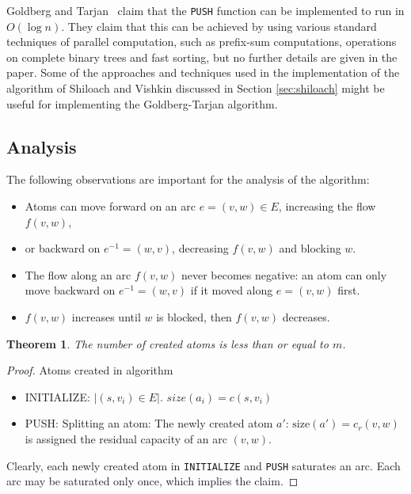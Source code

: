 \documentclass[a4paper,10pt, twocolumn]{article}
\newtheorem{theorem}[lemma]{Theorem}
\begin{document}
Goldberg and Tarjan~\cite{goldberg89} claim that the \lstinline|PUSH| function can be implemented to run in $O(\log n)$. They claim that this can be achieved by using various standard techniques of parallel computation, such as prefix-sum computations, operations on complete binary trees and fast sorting, but no further details are given in the paper. Some of the approaches and techniques used in the implementation of the algorithm of Shiloach and Vishkin discussed in Section \ref{sec:shiloach} might be useful for implementing the Goldberg-Tarjan algorithm.


\subsection{Analysis}
\label{sec:gt_analysis}
The following observations are important for the analysis of the algorithm:
\begin{itemize}
	\item Atoms can move forward on an arc $e=(v,w) \in E$, increasing the flow $f(v,w)$,
	\item or backward on $e^{-1}=(w,v)$, decreasing $f(v,w)$ and blocking $w$. 
	\item The flow along an arc $f(v,w)$ never becomes negative: an atom can only move backward on $e^{-1}=(w,v)$ if it moved along $e=(v,w)$ first.
	\item $f(v,w)$ increases until $w$ is blocked, then $f(v,w)$ decreases.
\end{itemize}

\begin{theorem}
The number of created atoms is less than or equal to $m$.
\end{theorem}
\begin{proof}
Atoms created in algorithm
\begin{itemize}
	\item INITIALIZE: $\lvert (s,v_i) \in E \rvert$. $size(a_i) = c(s,v_i)$
	\item PUSH: Splitting an atom: The newly created atom $a'$: $\mathrm{size}(a') = c_r(v,w)$ is assigned the residual capacity of an arc $(v,w)$.
\end{itemize}
Clearly, each newly created atom in \lstinline|INITIALIZE| and \lstinline|PUSH| saturates an arc. Each arc may be saturated only once, which implies the claim.
\end{proof}
\end{document}
